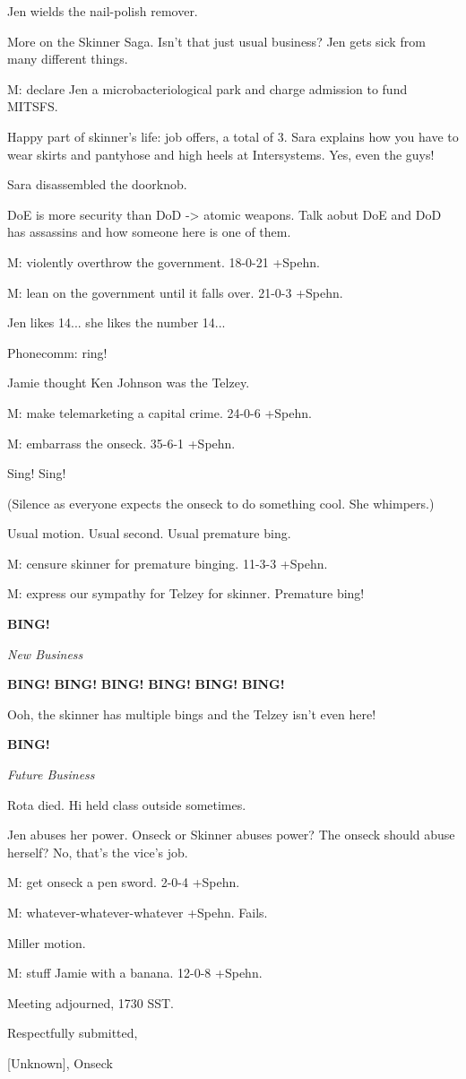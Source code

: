 \documentclass[12pt]{article}
\newcommand{\bing}{{\bf BING!} }
\newcommand{\goto}[1]{\bing \vskip 12pt \centerline{{\em{#1}}}}
\begin{document}
Jen wields the nail-polish remover.

More on the Skinner Saga. Isn't that just usual business? Jen gets sick from many different things.

M: declare Jen a microbacteriological park and charge admission to fund MITSFS.

Happy part of skinner's life: job offers, a total of 3. Sara explains how you have to wear skirts and pantyhose and high heels at Intersystems. Yes, even the guys!

Sara disassembled the doorknob.

DoE is more security than DoD -> atomic weapons.
Talk aobut DoE and DoD has assassins and how someone here is one of them.

M: violently overthrow the government. 18-0-21 +Spehn.

M: lean on the government until it falls over. 21-0-3 +Spehn.

Jen likes 14... she likes the number 14...

Phonecomm: ring!

Jamie thought Ken Johnson was the Telzey.

M: make telemarketing a capital crime. 24-0-6 +Spehn.

M: embarrass the onseck. 35-6-1 +Spehn.

Sing! Sing!

(Silence as everyone expects the onseck to do something cool. She whimpers.)

Usual motion. Usual second. Usual premature bing.

M: censure skinner for premature binging. 11-3-3 +Spehn.

M: express our sympathy for Telzey for skinner. Premature bing!

\goto{New Business}

\bing
\bing
\bing
\bing
\bing
\bing

Ooh, the skinner has multiple bings and the Telzey isn't even here!

\goto{Future Business}

Rota died. Hi held class outside sometimes.

Jen abuses her power. Onseck or Skinner abuses power? The onseck should abuse herself? No, that's the vice's job.

M: get onseck a pen sword. 2-0-4 +Spehn.

M: whatever-whatever-whatever +Spehn. Fails.

Miller motion.

M: stuff Jamie with a banana. 12-0-8 +Spehn.

\vspace{12pt}

\noindent
Meeting adjourned, 1730 SST.

\vspace{18pt}

\centerline{Respectfully submitted,}
\centerline{[Unknown], Onseck}
\end{document}
